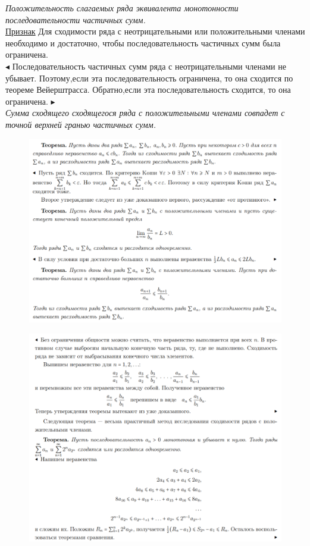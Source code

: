 \textit{Положительность слагаемых ряда эквивалента монотонности последовательности частичных сумм.}\\
\underline{Признак} Для сходимости ряда с неотрицательными или положительными членами необходимо и достаточно, чтобы последовательность частичных сумм была ограничена.\\
$\blacktriangleleft$
Последовательность частичных сумм ряда с неотрицательными членами не убывает. Поэтому,если эта последовательность ограничена, то она сходится по теореме Вейерштрасса. Обратно,если эта последовательность сходится, то она ограничена.
$\blacktriangleright$\\
\textit{Сумма сходящего сходящегося ряда с положительными членами совпадет с точной верхней гранью частичных сумм.} \\
 \begin{figure}[h!]
\centering
\includegraphics[scale=0.35]{Pictures/17_1.png}
\end{figure}
\begin{figure}[h!]
\centering
\includegraphics[scale=0.35]{Pictures/17_2.png}
\end{figure}
\newpage


